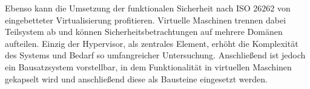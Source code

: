 \documentclass[
  a4paper,					    %
  twoside,
  DIV=calc,     				%
  bibliography=totoc,
  cleardoublepage=empty,
  ngerman,     					%
  final       					%
]{scrbook}
\begin{document}
%
%

Ebenso kann die Umsetzung der funktionalen Sicherheit nach ISO 26262 von eingebetteter Virtualisierung profitieren. Virtuelle Maschinen trennen dabei Teilsystem ab und können Sicherheitsbetrachtungen auf mehrere Domänen aufteilen. Einzig der Hypervisor, als zentrales Element, erhöht die Komplexität des Systems und Bedarf so umfangreicher Untersuchung. Anschließend ist jedoch ein Bausatzsystem vorstellbar, in dem Funktionalität in virtuellen Maschinen gekapselt wird und anschließend diese als Bausteine eingesetzt werden. 
\end{document}
